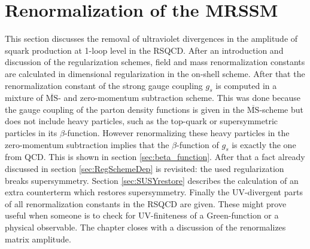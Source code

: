 \section{Renormalization of the MRSSM}\label{sec:renMRSSM}
This section discusses the removal of ultraviolet divergences in the amplitude of squark production at 1-loop level in the RSQCD. After an introduction and discussion of the regularization schemes, field and mass renormalization constants are calculated in dimensional regularization in the on-shell scheme. After that the renormalization constant of the strong gauge coupling $g_s$ is computed in a mixture of $\overline{\mathrm{MS}}$- and zero-momentum subtraction scheme. This was done because the gauge coupling of the parton density functions is given in the $\overline{\mathrm{MS}}$-scheme but does not include heavy particles, such as the top-quark or supersymmetric particles in its $\beta$-function. However renormalizing these heavy particles in the zero-momentum subtraction implies that the $\beta$-function of $g_s$ is exactly the one from QCD. This is shown in section \ref{sec:beta_function}. After that a fact already discussed in section \ref{sec:RegSchemeDep} is revisited: the used regularization breaks supersymmetry. Section \ref{sec:SUSYrestore} describes the calculation of an extra counterterm which restores supersymmetry. Finally the UV-divergent parts of all renormalization constants in the RSQCD are given. These might prove useful when someone is to check for UV-finiteness of a Green-function or a physical observable. The chapter closes with a discussion of the renormalizes matrix amplitude.

